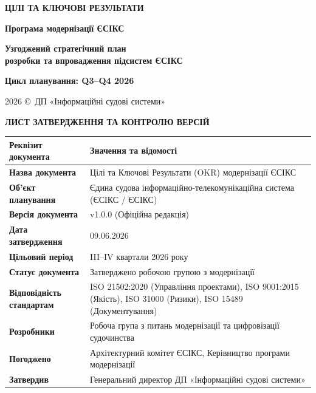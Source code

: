 \documentclass{article}
\newcommand\HUGE[1]{\fontsize{40}{40}\selectfont #1}
\begin{document}
\pagestyle{fancy}

\begin{titlepage}
  \AddToShipoutPictureBG*{\AtPageLowerLeft{\color{nato}\rule{\paperwidth}{\paperheight}}}
  \color{white}\thispagestyle{empty}\vspace*{3cm}\centering
  {\Huge \textbf{ЦІЛІ ТА КЛЮЧОВІ РЕЗУЛЬТАТИ} \par} \vspace{1cm}
  {\HUGE \textbf{Програма модернізації ЄСІКС} \par} \vspace{2cm}
  {\LARGE \textbf{Узгоджений стратегічний план \\ розробки та впровадження підсистем ЄСІКС} \par} \vspace{1.5cm}
  {\large\textbf{Цикл планування: Q3--Q4 2026} \par}
  \vfill
  {\large 2026 \copyright\ ДП «Інформаційні судові системи» \par}
\end{titlepage}

\newpage
\thispagestyle{empty}
\begin{center}
  {\Large\color{nato}\bfseries ЛИСТ ЗАТВЕРДЖЕННЯ ТА КОНТРОЛЮ ВЕРСІЙ\par}
\end{center}
\vspace{20pt}

\begin{longtable}{@{}p{4.0cm}p{10.2cm}@{}}
\toprule
\textbf{Реквізит документа} & \textbf{Значення та відомості} \\
\midrule
\textbf{Назва документа} & Цілі та Ключові Результати (OKR) модернізації ЄСІКС \\
\textbf{Об'єкт планування} & Єдина судова інформаційно-телекомунікаційна система (ЄСІКС / ЄСІКС) \\
\textbf{Версія документа} & v1.0.0 (Офіційна редакція) \\
\textbf{Дата затвердження} & 09.06.2026 \\
\textbf{Цільовий період} & III--IV квартали 2026 року \\
\textbf{Статус документа} & Затверджено робочою групою з модернізації \\
\textbf{Відповідність стандартам} & ISO 21502:2020 (Управління проектами), ISO 9001:2015 (Якість), ISO 31000 (Ризики), ISO 15489 (Документування) \\
\textbf{Розробники} & Робоча група з питань модернізації та цифровізації судочинства \\
\textbf{Погоджено} & Архітектурний комітет ЄСІКС, Керівництво програми модернізації \\
\textbf{Затвердив} & Генеральний директор ДП «Інформаційні судові системи» \\
\bottomrule
\end{longtable}
\end{document}

